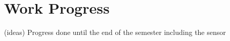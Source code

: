 \chapter{Work Progress}
\label{chapter:work_progress}

{\color{red}
(ideas) Progress done until the end of the semester including the sensor
}